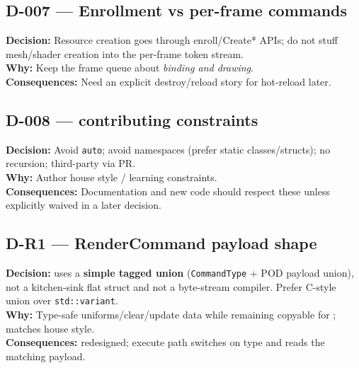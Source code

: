\subsection*{D-007 --- Enrollment vs per-frame commands}
\begin{decisionbox}[title={D-007 \quad visible in Renderer comments}]
\textbf{Decision:} Resource creation goes through enroll/Create* APIs; do not
stuff mesh/shader creation into the per-frame token stream.\\
\textbf{Why:} Keep the frame queue about \emph{binding and drawing}.\\
\textbf{Consequences:} Need an explicit destroy/reload story for hot-reload
later.
\end{decisionbox}

\subsection*{D-008 --- contributing constraints}
\begin{decisionbox}[title={D-008 \quad from docs/contributing.md}]
\textbf{Decision:} Avoid \texttt{auto}; avoid namespaces (prefer static
classes/structs); no recursion; third-party via PR.\\
\textbf{Why:} Author house style / learning constraints.\\
\textbf{Consequences:} Documentation and new code should respect these unless
explicitly waived in a later decision.
\end{decisionbox}

\subsection*{D-R1 --- RenderCommand payload shape}
\begin{decisionbox}[title={D-R1 \quad 2026-07-28}]
\textbf{Decision:}  uses a \textbf{simple tagged union}
(\texttt{CommandType} + POD payload union), not a kitchen-sink flat struct and
not a byte-stream compiler. Prefer C-style union over \texttt{std::variant}.\\
\textbf{Why:} Type-safe uniforms/clear/update data while remaining
copyable for ; matches house style.\\
\textbf{Consequences:}  redesigned; execute
path switches on type and reads the matching payload.
\end{decisionbox}

